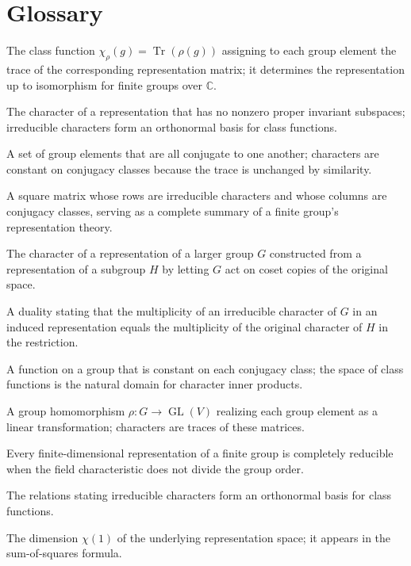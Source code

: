 \section*{Glossary}
\begin{description}[leftmargin=*,style=nextline,itemsep=0.3em]

\item[\textbf{Character.}] The class function $\chi_\rho(g)=\operatorname{Tr}(\rho(g))$ assigning to each group element the trace of the corresponding representation matrix; it determines the representation up to isomorphism for finite groups over $\mathbb C$.

\item[\textbf{Irreducible character.}] The character of a representation that has no nonzero proper invariant subspaces; irreducible characters form an orthonormal basis for class functions.

\item[\textbf{Conjugacy class.}] A set of group elements that are all conjugate to one another; characters are constant on conjugacy classes because the trace is unchanged by similarity.

\item[\textbf{Character table.}] A square matrix whose rows are irreducible characters and whose columns are conjugacy classes, serving as a complete summary of a finite group's representation theory.

\item[\textbf{Induced character.}] The character of a representation of a larger group $G$ constructed from a representation of a subgroup $H$ by letting $G$ act on coset copies of the original space.

\item[\textbf{Frobenius reciprocity.}] A duality stating that the multiplicity of an irreducible character of $G$ in an induced representation equals the multiplicity of the original character of $H$ in the restriction.

\item[\textbf{Class function.}] A function on a group that is constant on each conjugacy class; the space of class functions is the natural domain for character inner products.

\item[\textbf{Representation.}] A group homomorphism $\rho:G\to\operatorname{GL}(V)$ realizing each group element as a linear transformation; characters are traces of these matrices.

\item[\textbf{Maschke's theorem.}] Every finite-dimensional representation of a finite group is completely reducible when the field characteristic does not divide the group order.

\item[\textbf{Schur orthogonality.}] The relations stating irreducible characters form an orthonormal basis for class functions.

\item[\textbf{Degree of a character.}] The dimension $\chi(1)$ of the underlying representation space; it appears in the sum-of-squares formula.

\end{description}

